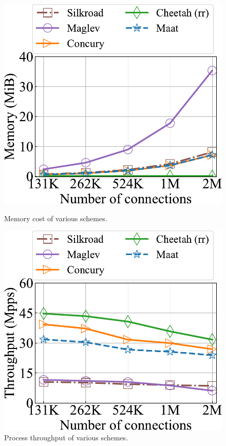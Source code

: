 \begin{figure}[t]
	\setlength{\abovecaptionskip}{0pt}
	\setlength{\belowcaptionskip}{-10pt}
	\centering
	\begin{minipage}{0.49\linewidth}
		\centering
		\includegraphics[width=1\linewidth]{experiment/6maatmemory.pdf}
		\caption{Memory cost of various schemes.}
		\label{11}%
	\end{minipage}
	\begin{minipage}{0.49\linewidth}
		\centering
		\includegraphics[width=1\linewidth]{experiment/7maatprocess.pdf}
		\caption{Process throughput of various schemes.}
		\label{12}%
	\end{minipage}
\end{figure}


